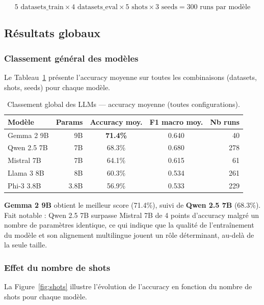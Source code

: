 \[
5 \text{ datasets\_train} \times 4 \text{ datasets\_eval} \times 5 \text{ shots} \times 3 \text{ seeds} = 300 \text{ runs par modèle}
\]

\subsection{Résultats globaux}

\subsubsection{Classement général des modèles}

Le Tableau~\ref{tab:ranking} présente l'accuracy moyenne sur toutes les combinaisons (datasets, shots, seeds) pour chaque modèle.

\begin{table}[h]
\centering
\caption{Classement global des LLMs — accuracy moyenne (toutes configurations).}
\label{tab:ranking}
\begin{tabular}{lrccr}
\toprule
\textbf{Modèle} & \textbf{Params} & \textbf{Accuracy moy.} & \textbf{F1 macro moy.} & \textbf{Nb runs} \\
\midrule
Gemma 2 9B   & 9B  & \textbf{71.4\%} & 0.640 & 40  \\
Qwen 2.5 7B  & 7B  & 68.3\%          & 0.680 & 278 \\
Mistral 7B   & 7B  & 64.1\%          & 0.615 & 61  \\
Llama 3 8B   & 8B  & 60.3\%          & 0.534 & 261 \\
Phi-3 3.8B   & 3.8B& 56.9\%          & 0.533 & 229 \\
\bottomrule
\end{tabular}
\end{table}

\textbf{Gemma 2 9B} obtient le meilleur score (71.4\%), suivi de \textbf{Qwen 2.5 7B} (68.3\%). Fait notable : Qwen 2.5 7B surpasse Mistral 7B de 4 points d'accuracy malgré un nombre de paramètres identique, ce qui indique que la qualité de l'entraînement du modèle et son alignement multilingue jouent un rôle déterminant, au-delà de la seule taille.

\subsubsection{Effet du nombre de shots}

La Figure~\ref{fig:shots} illustre l'évolution de l'accuracy en fonction du nombre de shots pour chaque modèle.

